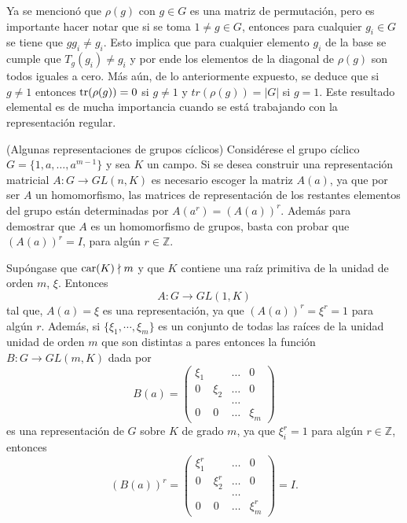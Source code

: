 \begin{nota}
Ya se mencionó que $\rho(g)$ con $g \in G$ es una matriz de permutación, pero es importante hacer notar que si se toma $ 1 \neq g \in G$, entonces para cualquier $g_i \in G$ se tiene que $ gg_i \neq g_i $. Esto implica que para cualquier elemento $g_i$ de la base se cumple que $T_g(g_i) \neq g_i$ y por ende los elementos de la diagonal de $\rho(g)$ son todos iguales a cero. Más aún, de lo anteriormente expuesto, se deduce que si $g \neq 1$ entonces $\operatorname{tr}(\rho(g)) = 0$ si $g \neq 1$ y $tr(\rho(g)) = |G|$ si $g = 1$. Este resultado elemental es de mucha importancia cuando se está trabajando con la representación regular.
\end{nota}
\begin{ejemplo}\label{rciclica}(Algunas representaciones de grupos cíclicos)
Considérese el grupo cíclico $G = \{1,a, \dots, a^{m-1} \}$ y sea $K$ un campo. Si se desea construir una representación matricial $A \colon G \to GL(n,K)$ es necesario escoger la matriz $A(a)$, ya que por ser $A$ un homomorfismo, las matrices de representación de los restantes elementos del grupo están determinadas por $A(a^r) = (A(a))^r $. Además para demostrar que $A$ es un homomorfismo de grupos, basta con probar que $(A(a))^r = I$, para algún $r \in \mathds{Z}$.

Supóngase que $\operatorname{car}(K) \nmid m$ y que $K$ contiene una raíz primitiva de la unidad de orden $m$,  $\xi$. Entonces 
\begin{equation*} A \colon G \to GL(1,K) \end{equation*}  tal que, $A(a)  = \xi$ es una representación, ya que $(A(a))^r = \xi^r = 1$ para algún $r$.  Además, si $\{ \xi_1, \cdots, \xi_m \}$ es un conjunto de todas las raíces de la unidad unidad de orden $m$ que son distintas a pares entonces la función $B \colon G \to GL(m,K)$ dada por 
\begin{equation*} B(a) = \begin{pmatrix}
\xi_1 &  &\dots &  0 \\
0 & \xi_2 & \dots & 0 \\
 & & \dots &  \\
 0 & 0 & \dots & \xi_m
\end{pmatrix} \end{equation*} es una representación de $G$ sobre $K$ de grado $m$, ya que $\xi_i^r = 1$ para algún $r \in \mathds{Z}$, entonces 
\begin{equation*} (B(a))^r = \begin{pmatrix}
\xi_1^r &  &\dots &  0 \\
0 & \xi_2^r & \dots & 0 \\
 & & \dots &  \\
 0 & 0 & \dots & \xi_m^r
\end{pmatrix} = I. \end{equation*}


\end{ejemplo}
